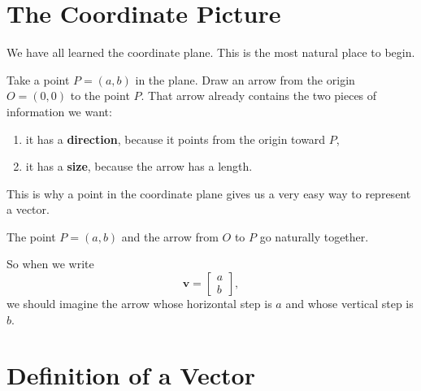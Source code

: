 \documentclass[11pt,a4paper]{article}
\newcommand{\vect}[1]{\boldsymbol{#1}}
\begin{document}
\section{The Coordinate Picture}

We have all learned the coordinate plane. This is the most natural place to begin.

Take a point \(P=(a,b)\) in the plane. Draw an arrow from the origin \(O=(0,0)\)
to the point \(P\). That arrow already contains the two pieces of information we want:

\begin{enumerate}[label=\arabic*.]
  \item it has a \textbf{direction}, because it points from the origin toward \(P\),
  \item it has a \textbf{size}, because the arrow has a length.
\end{enumerate}

This is why a point in the coordinate plane gives us a very easy way to represent a vector.

\begin{center}
\end{center}

\begin{intuitionblock}
The point \(P=(a,b)\) and the arrow from \(O\) to \(P\) go naturally together.

So when we write
\[
\vect{v} =
\begin{bmatrix}
a \\ b
\end{bmatrix},
\]
we should imagine the arrow whose horizontal step is \(a\) and whose vertical step is \(b\).
\end{intuitionblock}

\section{Definition of a Vector}
\end{document}
